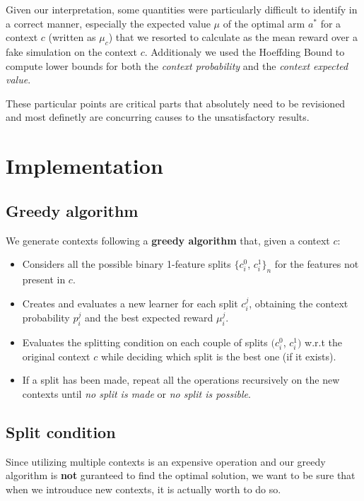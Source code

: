 Given our interpretation, some quantities were particularly difficult to identify in a correct manner, especially the expected value $\mu$ of the optimal arm $a^*$ for a context $c$ (written as $\mu_c$) that we resorted to calculate as the mean reward over a fake simulation on the context $c$.
Additionaly we used the Hoeffding Bound to compute lower bounds for both the \textit{context probability} and the \textit{context expected value}.

These particular points are critical parts that absolutely need to be revisioned and most definetly are concurring causes to the unsatisfactory results.

\section{Implementation}

\subsection{Greedy algorithm}

We generate contexts following a \textbf{greedy algorithm} that, given a context $c$:

\begin{itemize}
	\item Considers all the possible binary 1-feature splits $\{c_i^0$, $c_i^1\}_n$ for the features not present in $c$.
	\item Creates and evaluates a new learner for each split $c_i^j$, obtaining the context probability $p_i^j$ and the best expected reward $\mu_i^j$.
	\item Evaluates the splitting condition on each couple of splits $(c_i^0$, $c_i^1)$ w.r.t the original context $c$ while deciding which split is the best one (if it exists).
	\item If a split has been made, repeat all the operations recursively on the new contexts until \textit{no split is made} or \textit{no split is possible}.
\end{itemize}

\subsection{Split condition}

Since utilizing multiple contexts is an expensive operation and our greedy algorithm is \textbf{not} guranteed to find the optimal solution, we want to be sure that when we introuduce new contexts, it is actually worth to do so.

